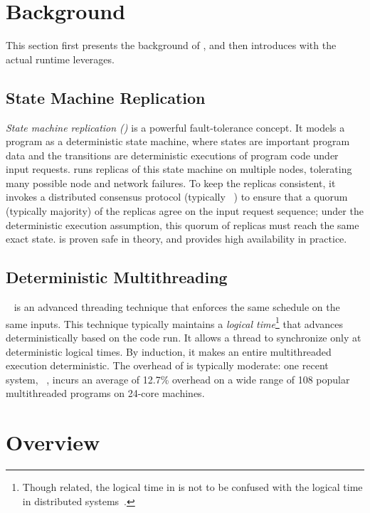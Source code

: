 \section{Background} \label{sec:background}

This section first presents the background of \smr, and then introduces \dmt 
with the actual \parrot runtime \xxx leverages.

\subsection{State Machine Replication} \label{sec:smr}

\emph{State machine replication (\smr)} is a powerful fault-tolerance
concept.  It models a program as a deterministic state machine, where
states are important program data and the transitions are deterministic
executions of program code under input requests.  \smr runs replicas of
this state machine on multiple nodes, tolerating many possible node and
network failures.  To keep the replicas consistent, it invokes a
distributed consensus protocol (typically \paxos~\cite{paxos}) to ensure
that a quorum (typically majority) of the replicas agree on the input
request sequence; under the deterministic execution assumption, this
quorum of replicas must reach the same exact state.  \smr is proven safe
in theory, and provides high availability in practice.

\subsection{Deterministic Multithreading} \label{sec:dmt}

\dmt~\cite{dpj:oopsla09, 
dmp:asplos09, kendo:asplos09, coredet:asplos10, dos:osdi10, ddos:asplos13, 
ics:oopsla13} is an advanced threading technique that enforces the same 
schedule 
on the same inputs.  This technique typically maintains a \emph{logical
  time}\footnote{Though related, the logical time in \dmt is not to be
  confused with the logical time in distributed
  systems~\cite{lamportclock}.} that advances deterministically based on
the code run.  It allows a thread to synchronize only at deterministic
logical times.  By induction, it makes an entire multithreaded execution
deterministic.  The overhead of \dmt is typically moderate: one recent
\dmt system, \parrot~\cite{parrot:sosp13}, incurs an average of 12.7\%
overhead on a wide range of 108 popular multithreaded programs on 24-core
machines.

\section{\xxx Overview} \label{sec:overview}

